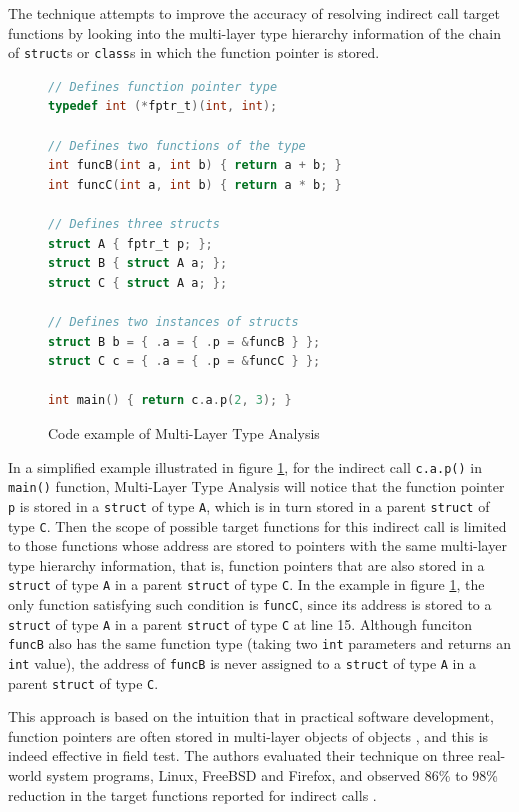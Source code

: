 \documentclass[12pt]{article}
\begin{document}
The technique attempts to improve the accuracy of resolving indirect call target functions by looking into the multi-layer type hierarchy information of the chain of \texttt{struct}s or \texttt{class}s in which the function pointer is stored.

\begin{figure}[t]
    \centering
    \begin{lstlisting}[language=c]
// Defines function pointer type
typedef int (*fptr_t)(int, int);

// Defines two functions of the type
int funcB(int a, int b) { return a + b; }
int funcC(int a, int b) { return a * b; }

// Defines three structs
struct A { fptr_t p; };
struct B { struct A a; };
struct C { struct A a; };

// Defines two instances of structs
struct B b = { .a = { .p = &funcB } };
struct C c = { .a = { .p = &funcC } };

int main() { return c.a.p(2, 3); }
    \end{lstlisting}
    \caption{Code example of Multi-Layer Type Analysis}
    \label{fig:mlta}
\end{figure}

In a simplified example illustrated in figure \ref{fig:mlta}, for the indirect call \texttt{c.a.p()} in \texttt{main()} function, Multi-Layer Type Analysis will notice that the function pointer \texttt{p} is stored in a \texttt{struct} of type \texttt{A}, which is in turn stored in a parent \texttt{struct} of type \texttt{C}. Then the scope of possible target functions for this indirect call is limited to those functions whose address are stored to pointers with the same multi-layer type hierarchy information, that is, function pointers that are also stored in a \texttt{struct} of type \texttt{A} in a parent \texttt{struct} of type \texttt{C}. In the example in figure \ref{fig:mlta}, the only function satisfying such condition is \texttt{funcC}, since its address is stored to a \texttt{struct} of type \texttt{A} in a parent \texttt{struct} of type \texttt{C} at line 15. Although funciton \texttt{funcB} also has the same function type (taking two \texttt{int} parameters and returns an \texttt{int} value), the address of \texttt{funcB} is never assigned to a \texttt{struct} of type \texttt{A} in a parent \texttt{struct} of type \texttt{C}.

This approach is based on the intuition that in practical software development, function pointers are often stored in multi-layer objects of objects \cite{mlta}, and this is indeed effective in field test. The authors evaluated their technique on three real-world system programs, Linux, FreeBSD and Firefox, and observed 86\% to 98\% reduction in the target functions reported for indirect calls \cite{mlta}.
\end{document}
